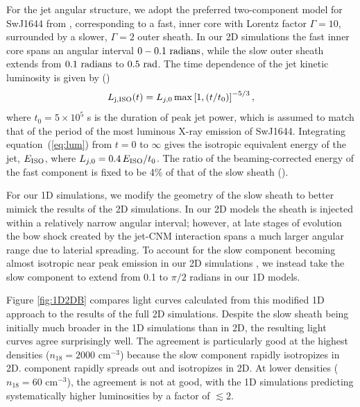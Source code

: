 \documentclass[usenatbib,fleqn]{mnras}
\begin{document}
For the jet angular structure, we adopt the preferred two-component
model for SwJ1644 from \citet{Mimica+2015}, corresponding to a fast,
inner core with Lorentz factor $\Gamma = 10$, surrounded by a slower,
$\Gamma=2$ outer sheath.  In our 2D simulations the fast inner core
spans an angular interval $0-0.1\ {\rm radians}$, while the slow outer
sheath extends from $0.1\ {\rm radians}$ to $0.5\ {\rm rad}$.  The
time dependence of the jet kinetic luminosity is given by
(\citealt{Mimica+2015})
\begin{equation}\label{eq:lum}
L_{\rm j, ISO}(t) = L_{j,0}\max\left[1, (t/t_0)\right]^{-5/3},
\end{equation}
where $t_0 = 5\times 10^5$ s is the duration of peak jet power, which
is assumed to match that of the period of the most luminous X-ray
emission of SwJ1644.  Integrating equation~(\ref{eq:lum}) from $t = 0$
to $\infty$ gives the isotropic equivalent energy of the jet, $E_{\rm
  ISO}$, where $L_{j,0}=0.4\, E_{\rm ISO}/t_0$.  The ratio of the
beaming-corrected energy of the fast component is fixed to be 4\% of
that of the slow sheath (\citealt{Mimica+2015}).

For our 1D simulations, we modify the geometry of the slow sheath to
better mimick the results of the 2D simulations.  In our 2D models the
sheath is injected within a relatively narrow angular interval;
however, at late stages of evolution the bow shock created by the
jet-CNM interaction spans a much larger angular range due to laterial
spreading.  To account for the slow component becoming almost
isotropic near peak emission in our 2D simulations \citep[bottom two
panels of Fig.~8 in][]{Mimica+2015}, we instead take the slow
component to extend from 0.1 to $\pi/2$ radians in our 1D models.

Figure \ref{fig:1D2DB} compares light curves calculated from this
modified 1D approach to the results of the full 2D simulations.
Despite the slow sheath being initially much broader in the 1D
simulations than in 2D, the resulting light curves agree surprisingly
well.  The agreement is particularly good at the highest densities
($n_{18}=2000$ cm$^{-3}$) because the slow component rapidly
isotropizes in 2D.  component rapidly spreads out and isotropizes in
2D.  At lower densities ($n_{18}=60$ cm$^{-3}$), the agreement is not
at good, with the 1D simulations predicting systematically higher
luminosities by a factor of $\lesssim 2$.

\end{document}
